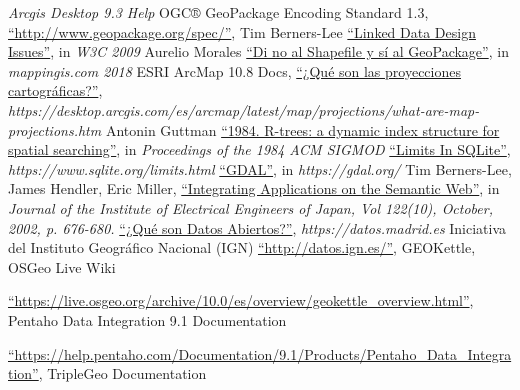 \begin{thebibliography}{99}
        \textit{Arcgis Desktop 9.3 Help}
    OGC® GeoPackage Encoding Standard 1.3,
        \href{http://www.geopackage.org/spec/}{``http://www.geopackage.org/spec/''},
     Tim Berners-Lee 
        \href{https://www.w3.org/DesignIssues/LinkedData.html}{``Linked Data Design Issues''},
        in \textit{W3C 2009}
     Aurelio Morales
        \href{https://mappinggis.com/2018/08/di-no-al-shapefile-y-si-al-geopackage/}{``Di no al Shapefile y sí al GeoPackage''},
        in \textit{mappingis.com 2018}
     ESRI ArcMap 10.8 Docs,
        \href{https://desktop.arcgis.com/es/arcmap/latest/map/projections/what-are-map-projections.htm}{``¿Qué son las proyecciones cartográficas?''},
        \textit{https://desktop.arcgis.com/es/arcmap/latest/map/projections/what-are-map-projections.htm}
     Antonin Guttman
        \href{https://dl.acm.org/doi/10.1145/602259.602266}{``1984. R-trees: a dynamic index structure for spatial searching''},
        in \textit{Proceedings of the 1984 ACM SIGMOD }
        \href{https://www.sqlite.org/limits.html}{``Limits In SQLite''},
        \textit{https://www.sqlite.org/limits.html}
        \href{https://gdal.org/}{``GDAL''},
        in \textit{https://gdal.org/}
     Tim Berners-Lee, James Hendler, Eric Miller,
        \href{https://www.w3.org/2002/07/swint}{``Integrating Applications on the Semantic Web''},
        in \textit{Journal of the Institute of Electrical Engineers of Japan, Vol 122(10), October, 2002, p. 676-680.}
        \href{https://datos.madrid.es/portal/site/egob/menuitem.400a817358ce98c34e937436a8a409a0/?vgnextoid=eba412b9ace9f310VgnVCM100000171f5a0aRCRD&vgnextchannel=eba412b9ace9f310VgnVCM100000171f5a0aRCRD&vgnextfmt=default}{``¿Qué son Datos Abiertos?''},
        \textit{https://datos.madrid.es}
    Iniciativa del Instituto Geográfico Nacional (IGN)
        \href{http://datos.ign.es/}{``http://datos.ign.es/''},
    GEOKettle, OSGeo Live Wiki
        
        \href{https://live.osgeo.org/archive/10.0/es/overview/geokettle\_overview.html}{``https://live.osgeo.org/archive/10.0/es/overview/geokettle\_overview.html''},
    Pentaho Data Integration 9.1 Documentation

        \href{https://help.pentaho.com/Documentation/9.1/Products/Pentaho\_Data\_Integration}{``https://help.pentaho.com/Documentation/9.1/Products/Pentaho\_Data\_Integration''},
    TripleGeo Documentation


\end{thebibliography}
